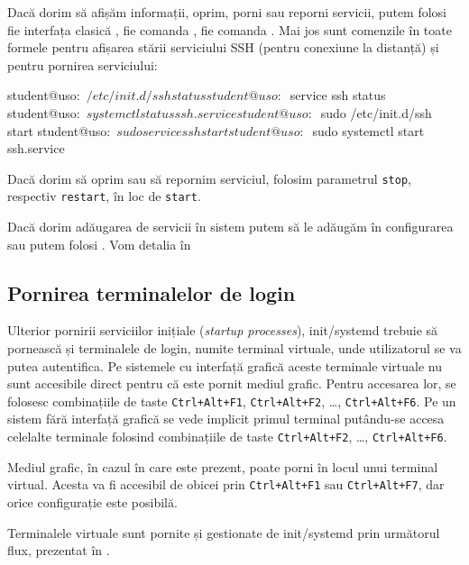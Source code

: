 Dacă dorim să afișăm informații, oprim, porni sau reporni servicii, putem folosi
fie interfața clasică , fie comanda , fie comanda .
Mai jos sunt comenzile în toate formele pentru afișarea stării serviciului SSH (pentru conexiune
la distanță) și pentru pornirea serviciului:

\begin{screen}
student@uso:~$ /etc/init.d/ssh status
student@uso:~$ service ssh status
student@uso:~$ systemctl status ssh.service
student@uso:~$ sudo /etc/init.d/ssh start
student@uso:~$ sudo service ssh start
student@uso:~$ sudo systemctl start ssh.service
\end{screen}

Dacă dorim să oprim sau să repornim serviciul, folosim parametrul \texttt{stop},
respectiv \texttt{restart}, în loc de \texttt{start}.

Dacă dorim adăugarea de servicii în sistem putem să le adăugăm în configurarea
 sau putem folosi . Vom detalia în

\subsection{Pornirea terminalelor de login}
\label{sec:boot:init-linux:login}

Ulterior pornirii serviciilor inițiale (\textit{startup processes}), init/systemd trebuie să
pornească și terminalele de login, numite terminal virtuale, unde utilizatorul
se va putea autentifica. Pe sistemele cu interfață grafică aceste terminale
virtuale nu sunt accesibile direct pentru că este pornit mediul grafic. Pentru
accesarea lor, se folosesc combinațiile de taste \texttt{Ctrl+Alt+F1}, \texttt{Ctrl+Alt+F2}, \ldots,
\texttt{Ctrl+Alt+F6}. Pe un sistem fără interfață grafică se
vede implicit primul terminal putându-se accesa celelalte terminale folosind
combinațiile de taste \texttt{Ctrl+Alt+F2}, \ldots, \texttt{Ctrl+Alt+F6}.

Mediul grafic, în cazul în care este prezent, poate porni în locul unui terminal
virtual. Acesta va fi accesibil de obicei prin \texttt{Ctrl+Alt+F1} sau \texttt{Ctrl+Alt+F7}, dar
orice configurație este posibilă.

Terminalele virtuale sunt pornite și gestionate de init/systemd prin următorul flux, prezentat în .

